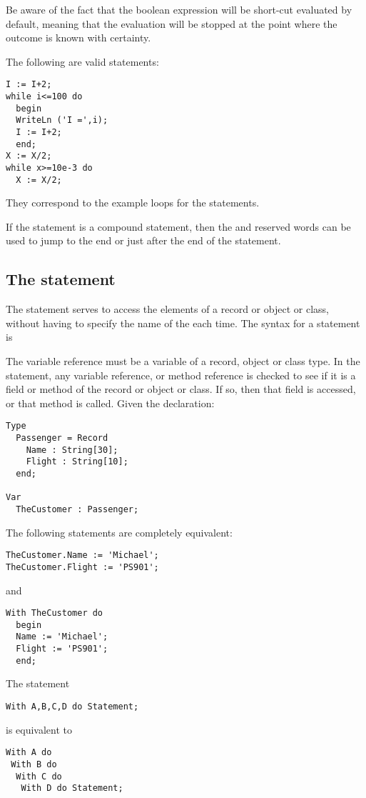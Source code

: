 Be aware of the fact that the boolean expression  will be 
short-cut evaluated by default, meaning that the evaluation will be stopped 
at the point where the outcome is known with certainty.

The following are valid  statements:
\begin{verbatim}
I := I+2;
while i<=100 do
  begin
  WriteLn ('I =',i);
  I := I+2;
  end;
X := X/2;
while x>=10e-3 do
  X := X/2;
\end{verbatim}
They correspond to the example loops for the  statements.

If the statement is a compound statement, then  the  and
 reserved words can be used to jump to the end or just
after the end of the  statement.

\subsection{The  statement}
\label{se:With}
The  statement serves to access the elements of a record
or object or class, without having to specify the name of the each time.
The syntax for a  statement is

The variable reference must be a variable of a record, object or class type.
In the  statement, any variable reference, or method reference is
checked to see if it is a field or method of the record or object or class.
If so, then that field is accessed, or that method is called.
Given the declaration:
\begin{verbatim}
Type 
  Passenger = Record
    Name : String[30];
    Flight : String[10];
  end;

Var 
  TheCustomer : Passenger;
\end{verbatim}
The following statements are completely equivalent:
\begin{verbatim}
TheCustomer.Name := 'Michael';
TheCustomer.Flight := 'PS901';
\end{verbatim}
and
\begin{verbatim}
With TheCustomer do
  begin
  Name := 'Michael';
  Flight := 'PS901';
  end;
\end{verbatim}
The statement
\begin{verbatim}
With A,B,C,D do Statement;
\end{verbatim}
is equivalent to
\begin{verbatim}
With A do
 With B do
  With C do
   With D do Statement;
\end{verbatim}

